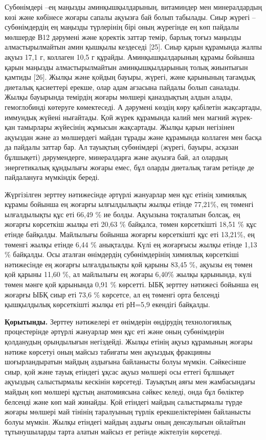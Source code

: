 \begin{multicols}{2}
Субөнімдері --ең маңызды аминқышқылдарының, витаминдер мен минералдардың
көзі және көбінесе жоғары сапалы ақуызға бай болып табылады. Сиыр жүрегі
-- субөнімдердің ең маңызды түрлерінің бірі оның жүрегінде ең көп
пайдалы мөлшерде В12 дәрумені және қоректік заттар темір, барлық тоғыз
маңызды алмастырылмайтын амин қышқылы кездеседі {[}25{]}. Сиыр қарын
құрамында жалпы ақуыз 17,1 г, коллаген 10,5 г құрайды. Аминқышқылдарының
құрамы бойынша қарын маңызды алмастырылмайтын аминқышқылдарының толық
жиынтығын қамтиды {[}26{]}. Жылқы және қойдың бауыры, жүрегі, және
қарынының тағамдық диеталық қасиеттері ерекше, олар адам ағзасына
пайдалы болып саналады. Жылқы бауырында темірдің жоғары мөлшері
қаназдықтың алдын алады, гемоглобинді көтеруге көмектеседі. А дәрумені
көздің көру қабілетін жақсартады, иммундық жүйені нығайтады. Қой жүрек
құрамында калий мен магний жүрек-қан тамырлары жүйесінің жұмысын
жақсартады. Жылқы қарын негізінен ақуыздан және аз мөлшердегі майдан
тұрады және құрамында коллаген мен басқа да пайдалы заттар бар. Ал
тауықтың субөнімдері (жүрегі, бауыры, асқазан бұлшықеті) дәрумендерге,
минералдарға және ақуызға бай, ал олардың энергетикалық құндылығы жоғары
емес, бұл оларды диеталық тағам ретінде де пайдалануға мүмкіндік береді.

Жүргізілген зерттеу нәтижесінде әртүрлі жануарлар мен құс етінің
химиялық кұрамы бойынша ең жоғарғы ылғылдылықты жылқы етінде 77,21\%, ең
төменгі ылғалдылықты құс еті 66,49 \% ие болды. Ақуызына тоқталатын
болсақ, ең жоғарғы көрсеткіш жылқы еті 20,63 \% байқалса, төмен
көрсеткішті 18,51 \% құс етінде байқалды. Майлылығы бойынша жоғарғы
көрсеткішті құс еті 13,21\%, ең төменгі жылқы етінде 6,44 \% анықталды.
Күлі ең жоғарғысы жылқы етінде 1,13 \% байқалды. Осы аталған өнімдердің
субөнімдерінің химиялық көрсеткіші нәтижесінде ең жоғарғы ылғалдылықты
қой қарыны 83,45 \%, ақуызы ең төмен қой қарыны 11,60 \%, ал майлылығы
ең жоғары 6,40\% жылқы қарынында, күлі төмен мәнге қой қарынында 0,91 \%
көрсетті. ЫБҚ зерттеу нәтижесі бойынша ең жоғарғы ЫБҚ сиыр еті 73,6 \%
көрсетсе, ал ең төменгі орта белсенді қышқылдылық көрсеткішті жылқы еті
рН=5,9 екендігі байқалды.

{\bfseries Қорытынды.} Зерттеу нәтижелері ет өнімдерін өндірудің
технологиялық процестерінде әртүрлі жануарлар мен құс еті және оның
субөнімдерін қолданудың орындылығын негіздейді. Жылқы етінің ақуыз
құрамының жоғары нәтиже көрсетуі оның майсыз табиғаты мен ақуыздық
фракцияны шоғырландыратын майдың аздығына байланысты болуы мүмкін.
Сәйкесінше сиыр, қой және тауық етіндегі ұқсас ақуыз мөлшері осы еттегі
бұлшықет ақуыздың салыстырмалы кескінін көрсетеді. Тауықтың аяғы мен
жамбасындағы майдың көп мөлшері құстың анатомиясына сәйкес келеді, онда
бұл бөліктер белсенді және көп май жинайды. Қой етіндегі майдың
салыстырмалы түрде жоғары мөлшері май тінінің таралуының түрлік
ерекшеліктерімен байланысты болуы мүмкін. Жылқы етіндегі майдың аздығы
оның денсаулығын ойлайтын тұтынушыларды тарта алатын майсыз ет ретінде
жіктелуін көрсетеді.


\end{multicols}
